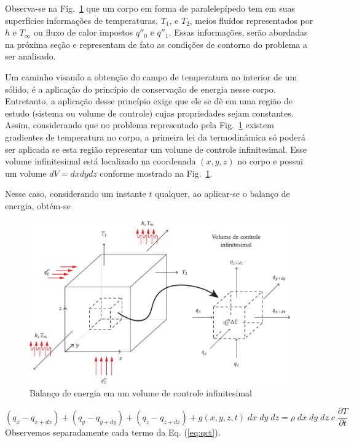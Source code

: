 Observa-se na  Fig.~\ref{fig:balanco} que um corpo em forma de paralelepípedo tem em suas superfícies informações de temperaturas, $T_{1}$, e $T_{2}$, meios fluídos representados por $h$ e $T_{\infty}$ ou fluxo de calor impostos $q''_0$ e $q''_1$. Essas informações, serão abordadas na próxima seção e representam de fato as condições de contorno do problema a ser analisado.

Um caminho visando a obtenção do campo de temperatura no interior de um sólido, é  a aplicação do princípio de conservação de energia nesse corpo. Entretanto, a aplicação desse princípio exige que ele se dê em uma região de estudo (sistema ou volume de controle) cujas propriedades sejam constantes. Assim, considerando que no problema representado pela Fig.~\ref{fig:balanco} existem gradientes de temperatura no corpo, a primeira lei da termodinâmica só poderá ser aplicada se esta região representar um volume de controle infinitesimal. Esse volume infinitesimal está localizado na coordenada $(x, y, z)$ no corpo e possui um volume $dV = dx dy dz$ conforme mostrado na Fig.~\ref{fig:balanco}. 

Nesse caso, considerando um instante $t$ qualquer, ao aplicar-se o balanço de energia, obtém-se
\begin{figure}[ht]
	\centering
	\includegraphics[scale=0.7]{figuras/cap1/balancoEnergia.pdf}
	\caption{Balanço de energia em um volume de controle infinitesimal}	
	\label{fig:balanco}
\end{figure}
\begin{equation}\label{eq:qct}	
	(q_x - q_{x + dx}) +
	(q_y - q_{y + dy}) +
	(q_z - q_{z + dz}) + 
	g(x,y,z,t)  \; dx \; dy \; dz = 
	\rho \; dx \; dy \; dz \; c \; \frac{\partial T}{\partial t}
\end{equation}
Observemos separadamente cada termo da Eq. (\ref{eq:qct}).

